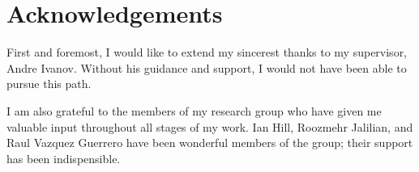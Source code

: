 \chapter{Acknowledgements}

First and foremost, I would like to extend my sincerest thanks to my supervisor, Andre Ivanov. Without his guidance and support, I would not have been able to pursue this path.

I am also grateful to the members of my research group who have given me valuable input throughout all stages of my work. Ian Hill, Roozmehr Jalilian, and Raul Vazquez Guerrero have been wonderful members of the group; their support has been indispensible.